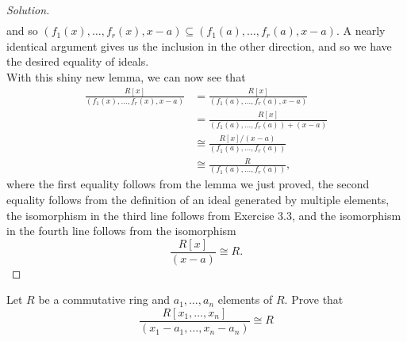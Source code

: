 \documentclass[12pt]{article}
\newenvironment{problem}[2][Problem]{\begin{trivlist}
\item[\hskip \labelsep {\bfseries #1}\hskip \labelsep {\bfseries #2.}]}{\end{trivlist}}
\newenvironment{solution}
  {\renewcommand\qedsymbol{$\blacksquare$}\begin{proof}[Solution]}
{\end{proof}}
\theoremstyle{remark}
\begin{document}
\begin{solution}
\begin{align*}
  \end{align*}
  and so $(f_1(x),\dots,f_r(x),x-a)\subseteq (f_1(a),\dots,f_r(a),x-a)$.
  A nearly identical argument gives us the inclusion in the other direction,
  and so we have the desired equality of ideals. \\
  \indent With this shiny new lemma, we can now see that\\
  \begin{align*}
    \frac{R[x]}{(f_1(x),\dots,f_r(x),x-a)} 
    &= \frac{R[x]}{(f_1(a),\dots,f_r(a),x-a)} \\
    &= \frac{R[x]}{(f_1(a),\dots,f_r(a))+(x-a)} \\
    &\cong \frac{R[x]/(x-a)}{(f_1(a),\dots,f_r(a))} \\
    &\cong \frac{R}{(f_1(a),\dots,f_r(a))} ,
  \end{align*}
  where the first equality follows from the lemma we just proved,
  the second equality follows from the definition of an ideal generated
  by multiple elements, the isomorphism in the third line follows
  from Exercise 3.3, and the isomorphism in the fourth line
  follows from the isomorphism 
  \begin{equation*}
    \frac{R[x]}{(x-a)}\cong R.
  \end{equation*}
\end{solution}
\begin{problem}{4.12}
  Let $R$ be a commutative ring and $a_1,\dots,a_n$ elements of $R$.
  Prove that
  \begin{equation*}
    \frac{R[x_1,\dots,x_n]}{(x_1-a_1,\dots,x_n-a_n)}\cong R
  \end{equation*}
\end{problem}
\end{document}
